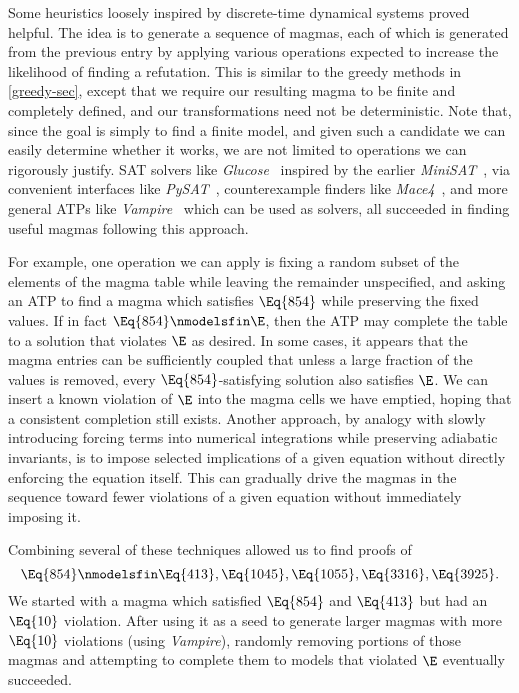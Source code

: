  Some heuristics loosely inspired by discrete-time dynamical systems proved helpful.
 The idea is to generate a sequence of magmas, each of which is generated from the previous entry by applying various operations expected to increase the likelihood of
 finding a refutation.  This is similar to the greedy methods in \ref{greedy-sec}, except that we require our resulting magma to be finite and completely
 defined, and our transformations need not be deterministic.  Note that, since the goal is simply to find a finite model, and given such a candidate we can easily
 determine whether it works, we are not limited to operations we can rigorously justify.  SAT solvers like
 \emph{Glucose}~\cite{DBLP:conf/ijcai/AudemardS09,DBLP:conf/cp/AudemardS12} inspired by the earlier \emph{MiniSAT}~\cite{DBLP:conf/sat/EenS03},
 via convenient interfaces like \emph{PySAT}~\cite{imms-sat18, itk-sat24}, counterexample finders like \emph{Mace4}~\cite{prover9-mace4}, and more general ATPs like
 \emph{Vampire}~\cite{DBLP:conf/cav/KovacsV13} which can be used as solvers, all succeeded in finding useful magmas following this approach.

 For example, one operation we can apply is fixing a random subset of the elements of the magma table while leaving the remainder unspecified,
 and asking an ATP to find a magma which satisfies $\Eq{854}$ while preserving the fixed values.
 If in fact $\Eq{854} \nmodelsfin \E$, then the ATP may complete the table to a solution that violates $\E$ as desired.  In some cases,
 it appears that the magma entries can be sufficiently coupled that unless a large fraction of the values is removed,
 every $\Eq{854}$-satisfying solution also satisfies $\E$.
 We can insert a known violation of $\E$ into the magma cells we have emptied, hoping that a consistent completion still exists.
 Another approach, by analogy with slowly introducing forcing terms into numerical integrations while preserving adiabatic invariants, is to impose selected
 implications of a given equation without directly enforcing the equation itself.  This can gradually drive the magmas in the
 sequence toward fewer violations of a given equation without immediately imposing it.

Combining several of these techniques allowed us to find proofs of
$$\Eq{854} \nmodelsfin \Eq{413}, \Eq{1045}, \Eq{1055}, \Eq{3316}, \Eq{3925}.$$
 We started with a magma which satisfied $\Eq{854}$ and $\Eq{413}$ but had an $\Eq{10}$ violation.
After using it as a seed to generate larger magmas with more $\Eq{10}$ violations (using \emph{Vampire}),
randomly removing portions of those magmas and attempting to complete them to models that violated $\E$ eventually succeeded.

